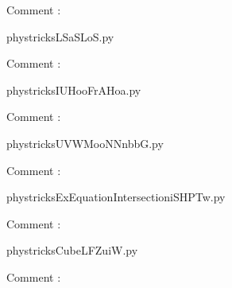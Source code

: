     Comment : 

    \clearpage
    


    \newcommand{\CaptionFigLSaSLoS}{<+Type your caption here+>}
    \begin{center}
        
    \end{center}
    phystricksLSaSLoS.py

    Comment : 

    \clearpage
    


    \newcommand{\CaptionFigIUHooFrAHoa}{<+Type your caption here+>}
    \begin{center}
        
    \end{center}
    phystricksIUHooFrAHoa.py

    Comment : 

    \clearpage
    


    \newcommand{\CaptionFigUVWMooNNnbbG}{<+Type your caption here+>}
    \begin{center}
        
    \end{center}
    phystricksUVWMooNNnbbG.py

    Comment : 

    \clearpage
    


    \newcommand{\CaptionFigExEquationIntersectioniSHPTw}{<+Type your caption here+>}
    \begin{center}
        
    \end{center}
    phystricksExEquationIntersectioniSHPTw.py

    Comment : 

    \clearpage
    


    \newcommand{\CaptionFigCubeLFZuiW}{<+Type your caption here+>}
    \begin{center}
        
    \end{center}
    phystricksCubeLFZuiW.py

    Comment : 

